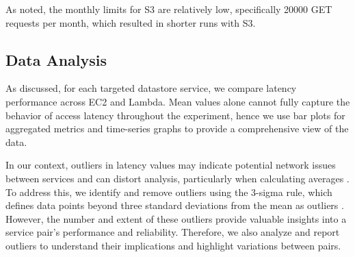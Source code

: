As noted, the monthly limits for S3 are relatively low, specifically 20000 GET requests per month, which resulted in shorter runs with S3.

\subsection{Data Analysis}
\label{sec:analysis}

As discussed, for each targeted datastore service, we compare latency performance across EC2 and Lambda. Mean values alone cannot fully capture the behavior of access latency throughout the experiment, hence we use bar plots for aggregated metrics and time-series graphs to provide a comprehensive view of the data.

In our context, outliers in latency values may indicate potential network issues between services and can distort analysis, particularly when calculating averages \cite{book_bermbach_cloud_service_benchmarking}. To address this, we identify and remove outliers using the 3-sigma rule, which defines data points beyond three standard deviations from the mean as outliers \cite{book_han_data_mining}. However, the number and extent of these outliers provide valuable insights into a service pair's performance and reliability. Therefore, we also analyze and report outliers to understand their implications and highlight variations between pairs.
